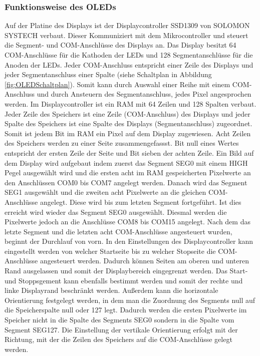 \subsubsection{Funktionsweise des \acl{OLED}s}\label{sec:FunktionOLED}
Auf der Platine des Displays ist der Displaycontroller SSD1309 von SOLOMON SYSTECH verbaut. Dieser Kommuniziert mit dem Mikrocontroller und steuert die Segment- und COM-Anschlüsse des Displays an. Das Display besitzt 64 COM-Anschlüsse für die Kathoden der LEDs und 128 Segmentanschlüsse für die Anoden der LEDs. Jeder COM-Anschluss entspricht einer Zeile des Displays und jeder Segmentanschluss einer Spalte (siehe Schaltplan in Abbildung \ref{fig:OLEDSchaltplan}). Somit kann durch Auswahl einer Reihe mit einem COM-Anschluss und durch Ansteuern des Segmentanschluss, jedes Pixel angesprochen werden. Im Displaycontroller ist ein \ac{RAM} mit 64 Zeilen und 128 Spalten verbaut. Jeder Zeile des Speichers ist eine Zeile (COM-Anschluss) des Displays und jeder Spalte des Speichers ist eine Spalte des Displays (Segmentanschluss) zugeordnet. Somit ist jedem Bit im \ac{RAM} ein Pixel auf dem Display zugewiesen. Acht Zeilen des Speichers werden zu einer Seite zusammengefassst. Bit null eines Wertes entspricht der ersten Zeile der Seite und Bit sieben der achten Zeile. Ein Bild auf dem Display wird aufgebaut indem zuerst das Segment SEG0 mit einem HIGH Pegel ausgewählt wird und die ersten acht im \ac{RAM} gespeicherten Pixelwerte an den Anschlüssen COM0 bis COM7 angelegt werden. Danach wird das Segment SEG1 ausgewählt und die zweiten acht Pixelwerte an die gleichen COM-Anschlüsse angelegt. Diese wird bis zum letzten Segment fortgeführt. Ist dies erreicht wird wieder das Segment SEG0 ausgewählt. Diesmal werden die Pixelwerte jedoch an die Anschlüsse COM8 bis COM15 angelegt. Nach dem das letzte Segment und die letzten acht COM-Anschlüsse angesteuert wurden, beginnt der Durchlauf von vorn. In den Einstellungen des Displaycontroller kann eingestellt werden von welcher Startseite bis zu welcher Stopseite die COM-Anschlüsse angesteuert werden. Dadurch können Seiten am oberen und unteren Rand ausgelassen und somit der Displaybereich eingegrenzt werden. Das Start- und Stoppsgement kann ebenfalls bestimmt werden und somit der rechte und linke Displayrand beschränkt werden. Außerdem kann die horizontale Orientierung festgelegt werden, in dem man die Zuordnung des Segments null auf die Speicherspalte null oder 127 legt. Dadurch werden die ersten Pixelwerte im Speicher nicht in die Spalte des Segments SEG0 sondern in die Spalte vom Segment SEG127. Die Einstellung der vertikale Orientierung erfolgt mit der Richtung, mit der die Zeilen des Speichers auf die COM-Anschlüsse gelegt werden.
